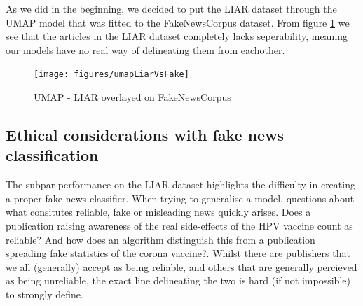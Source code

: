 As we did in the beginning, we decided to put the LIAR dataset through the UMAP model that was fitted to the
FakeNewsCorpus dataset. From figure \ref{fig:liarvsfake} we see that the articles in the LIAR dataset completely lacks seperability,
meaning our models have no real way of delineating them from eachother.
\begin{figure}[htpb]
  \centering
  \texttt{[image: figures/umapLiarVsFake]}
  \caption{UMAP - LIAR overlayed on FakeNewsCorpus}
  \label{fig:liarvsfake}
\end{figure}

\subsection{Ethical considerations with fake news classification}
The subpar performance on the LIAR dataset highlights the difficulty in creating a proper fake news classifier. When trying to
generalise a model, questions about what consitutes reliable, fake or misleading news quickly arises. Does a publication raising awareness
of the real side-effects of the HPV vaccine count as reliable? And how does an algorithm distinguish this from a
publication spreading fake statistics of the corona vaccine?. Whilst there are publishers that we all (generally)
accept as being reliable, and others that are generally percieved as being unreliable, the exact line delineating the
two is hard (if not impossible) to strongly define.
\newpage

